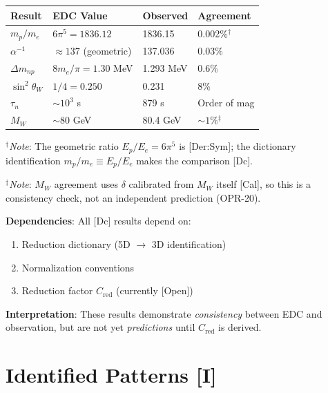 \begin{center}
\begin{tabular}{llll}
\toprule
\textbf{Result} & \textbf{EDC Value} & \textbf{Observed} & \textbf{Agreement} \\
\midrule
$m_p/m_e$ & $6\pi^5 = 1836.12$ & 1836.15 & 0.002\%$^\dagger$ \\
$\alpha^{-1}$ & $\approx 137$ (geometric) & 137.036 & 0.03\% \\
$\Delta m_{np}$ & $8m_e/\pi = 1.30$ MeV & 1.293 MeV & 0.6\% \\
$\sin^2\theta_W$ & $1/4 = 0.250$ & 0.231 & 8\% \\
$\tau_n$ & $\sim 10^3$ s & 879 s & Order of mag \\
$M_W$ & $\sim 80$ GeV & 80.4 GeV & $\sim 1\%$$^\ddagger$ \\
\bottomrule
\end{tabular}
\end{center}

$^\dagger$\textit{Note}: The geometric ratio $E_p/E_e = 6\pi^5$ is [Der:Sym]; the dictionary
identification $m_p/m_e \equiv E_p/E_e$ makes the comparison [Dc].

$^\ddagger$\textit{Note}: $M_W$ agreement uses $\delta$ calibrated from $M_W$ itself [Cal],
so this is a consistency check, not an independent prediction (OPR-20).

\textbf{Dependencies}:
All [Dc] results depend on:
\begin{enumerate}[nosep]
\item Reduction dictionary (5D $\to$ 3D identification)
\item Normalization conventions
\item Reduction factor $C_{\text{red}}$ (currently [Open])
\end{enumerate}

\textbf{Interpretation}: These results demonstrate \textit{consistency}
between EDC and observation, but are not yet \textit{predictions} until
$C_{\text{red}}$ is derived.

\section{Identified Patterns [I]}
\label{sec:identified}

